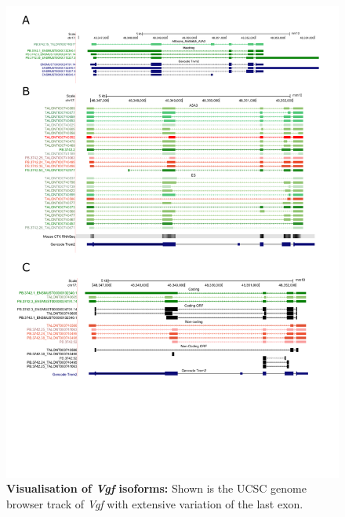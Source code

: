 \begin{figure}[htp]
	\begin{center}
		\includegraphics[page=13,trim={0 12cm 0 0},scale = 0.85]{Figures/pdfjoiner.pdf}
	\end{center}
	\captionsetup{width=0.95\textwidth}
	\caption[Visualisation of \textit{Vgf} isoforms]%
	{\textbf{Visualisation of \textit{Vgf} isoforms:} Shown is the UCSC genome browser track of \textit{Vgf} with extensive variation of the last exon.}   
	\label{fig:vgf_track}
\end{figure}

\newpage
